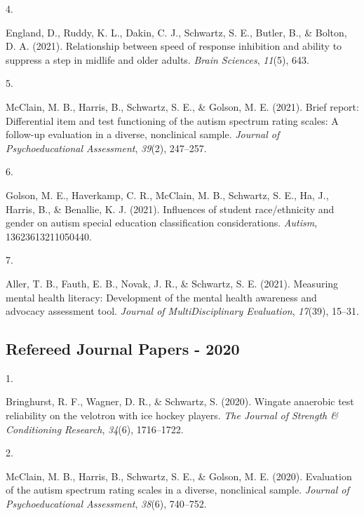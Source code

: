 \documentclass[11pt,a4paper,]{moderncv}
\newlength{\csllabelwidth}
\newcommand{\CSLLeftMargin}[1]{\parbox[t]{\csllabelwidth}{#1}}
\newcommand{\CSLRightInline}[1]{\parbox[t]{\linewidth - \csllabelwidth}{#1}}
\begin{document}
\leavevmode{}%
\CSLLeftMargin{4. }
\CSLRightInline{England, D., Ruddy, K. L., Dakin, C. J., Schwartz, S.
E., Butler, B., \& Bolton, D. A. (2021). Relationship between speed of
response inhibition and ability to suppress a step in midlife and older
adults. \emph{Brain Sciences}, \emph{11}(5), 643.}

\leavevmode{}%
\CSLLeftMargin{5. }
\CSLRightInline{McClain, M. B., Harris, B., Schwartz, S. E., \& Golson,
M. E. (2021). Brief report: Differential item and test functioning of
the autism spectrum rating scales: A follow-up evaluation in a diverse,
nonclinical sample. \emph{Journal of Psychoeducational Assessment},
\emph{39}(2), 247--257.}

\leavevmode{}%
\CSLLeftMargin{6. }
\CSLRightInline{Golson, M. E., Haverkamp, C. R., McClain, M. B.,
Schwartz, S. E., Ha, J., Harris, B., \& Benallie, K. J. (2021).
Influences of student race/ethnicity and gender on autism special
education classification considerations. \emph{Autism},
13623613211050440.}

\leavevmode{}%
\CSLLeftMargin{7. }
\CSLRightInline{Aller, T. B., Fauth, E. B., Novak, J. R., \& Schwartz,
S. E. (2021). Measuring mental health literacy: Development of the
mental health awareness and advocacy assessment tool. \emph{Journal of
MultiDisciplinary Evaluation}, \emph{17}(39), 15--31.}

\vspace{7mm}

\hypertarget{refereed-journal-papers---2020}{%
\subsection{\texorpdfstring{\textbf{Refereed Journal Papers -
2020}}{Refereed Journal Papers - 2020}}\label{refereed-journal-papers---2020}}

\hypertarget{refs_journals2020}{}
\leavevmode{}%
\CSLLeftMargin{1. }
\CSLRightInline{Bringhurst, R. F., Wagner, D. R., \& Schwartz, S.
(2020). Wingate anaerobic test reliability on the velotron with ice
hockey players. \emph{The Journal of Strength \& Conditioning Research},
\emph{34}(6), 1716--1722.}

\leavevmode{}%
\CSLLeftMargin{2. }
\CSLRightInline{McClain, M. B., Harris, B., Schwartz, S. E., \& Golson,
M. E. (2020). Evaluation of the autism spectrum rating scales in a
diverse, nonclinical sample. \emph{Journal of Psychoeducational
Assessment}, \emph{38}(6), 740--752.}
\end{document}
